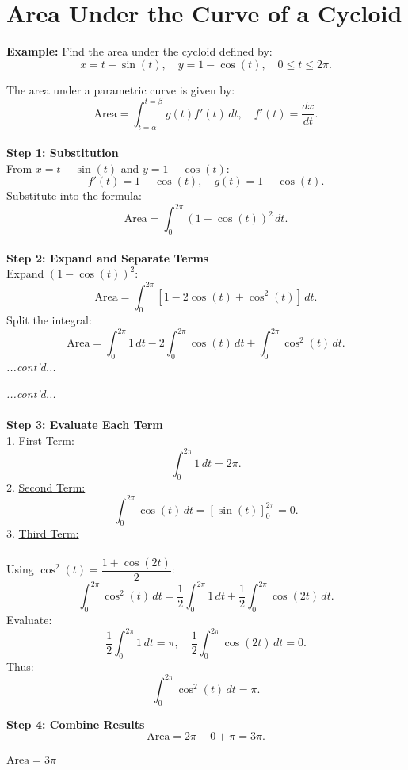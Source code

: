 \documentclass{article}
\begin{document}
\section*{Area Under the Curve of a Cycloid}
\begin{examplebox}
\textbf{Example:} Find the area under the cycloid defined by:
\[
    x = t - \sin(t), \quad y = 1 - \cos(t), \quad 0 \leq t \leq 2\pi.
\]

\begin{solutionbox}
The area under a parametric curve is given by:
\[
    \text{Area} = \int_{t=\alpha}^{t=\beta} g(t) f'(t) \, dt, \quad f'(t) = \frac{dx}{dt}.
\]
\\
\textbf{Step 1: Substitution} \\
From \( x = t - \sin(t) \) and \( y = 1 - \cos(t) \):  
\[
    f'(t) = 1 - \cos(t), \quad g(t) = 1 - \cos(t).
\]
Substitute into the formula:
\[
    \text{Area} = \int_{0}^{2\pi} (1 - \cos(t))^2 \, dt.
\]
\\
\textbf{Step 2: Expand and Separate Terms} \\
Expand \( (1 - \cos(t))^2 \):
\[
    \text{Area} = \int_{0}^{2\pi} [1 - 2\cos(t) + \cos^2(t)] \, dt.
\]
Split the integral:
\[
    \text{Area} = \int_{0}^{2\pi} 1 \, dt - 2\int_{0}^{2\pi} \cos(t) \, dt + \int_{0}^{2\pi} \cos^2(t) \, dt.
\]
\textit{...cont'd...}
\end{solutionbox}
\end{examplebox}
\begin{examplebox}
\begin{solutionbox}
\textit{...cont'd...} \\
\\
\textbf{Step 3: Evaluate Each Term} \\
1. \underline{First Term:}  
\[
    \int_{0}^{2\pi} 1 \, dt = 2\pi.
\]  
2. \underline{Second Term:}  
\[
    \int_{0}^{2\pi} \cos(t) \, dt = [\sin(t)]_{0}^{2\pi} = 0.
\]  
3. \underline{Third Term:} \\
\\
Using \( \cos^2(t) = \dfrac{1 + \cos(2t)}{2} \):  
\[
    \int_{0}^{2\pi} \cos^2(t) \, dt = \frac{1}{2} \int_{0}^{2\pi} 1 \, dt + \frac{1}{2} \int_{0}^{2\pi} \cos(2t) \, dt.
\]
Evaluate:  
\[
    \frac{1}{2} \int_{0}^{2\pi} 1 \, dt = \pi, \quad \frac{1}{2} \int_{0}^{2\pi} \cos(2t) \, dt = 0.
\]
Thus:
\[
    \int_{0}^{2\pi} \cos^2(t) \, dt = \pi.
\]

\textbf{Step 4: Combine Results}  
\[
    \text{Area} = 2\pi - 0 + \pi = 3\pi.
\]

\begin{answerbox}
\( \text{Area} = 3\pi \) 
\end{answerbox}

\end{solutionbox}
\end{examplebox}
\end{document}

